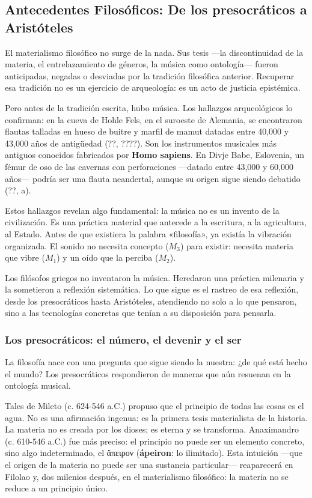 \documentclass[14pt, a4paper]{article}
\begin{document}
\subsection{Antecedentes Filosóficos: De los presocráticos a Aristóteles}
\label{antecedentes-filosoficos}
El materialismo filosófico no surge de la nada. Sus tesis —la
discontinuidad de la materia, el entrelazamiento de géneros, la música
como ontología— fueron anticipadas, negadas o desviadas por la
tradición filosófica anterior. Recuperar esa tradición no es un
ejercicio de arqueología: es un acto de justicia epistémica.

Pero antes de la tradición escrita, hubo música. Los hallazgos
arqueológicos lo confirman: en la cueva de Hohle Fels, en el suroeste
de Alemania, se encontraron flautas talladas en hueso de buitre y
marfil de mamut datadas entre 40,000 y 43,000 años de antigüedad
(??, ????). Son los instrumentos musicales más antiguos
conocidos fabricados por \textbf{Homo sapiens}. En Divje Babe, Eslovenia, un
fémur de oso de las cavernas con perforaciones —datado entre 43,000 y
60,000 años— podría ser una flauta neandertal, aunque su origen sigue
siendo debatido (??, a).

Estos hallazgos revelan algo fundamental: la música no es un invento
de la civilización. Es una práctica material que antecede a la
escritura, a la agricultura, al Estado. Antes de que existiera la
palabra «filosofía», ya existía la vibración organizada. El sonido no
necesita concepto (\(M_3\)) para existir: necesita materia que vibre
(\(M_1\)) y un oído que la perciba (\(M_2\)).

Los filósofos griegos no inventaron la música. Heredaron una práctica
milenaria y la sometieron a reflexión sistemática. Lo que sigue es el
rastreo de esa reflexión, desde los presocráticos hasta Aristóteles,
atendiendo no solo a lo que pensaron, sino a las tecnologías concretas
que tenían a su disposición para pensarla.
\subsubsection{Los presocráticos: el número, el devenir y el ser}
\label{presocraticos}
La filosofía nace con una pregunta que sigue siendo la nuestra: ¿de
qué está hecho el mundo? Los presocráticos respondieron de maneras que
aún resuenan en la ontología musical.

Tales de Mileto (c. 624-546 a.C.) propuso que el principio de todas
las cosas es el agua. No es una afirmación ingenua: es la primera tesis
materialista de la historia. La materia no es creada por los dioses;
es eterna y se transforma. Anaximandro (c. 610-546 a.C.) fue más
preciso: el principio no puede ser un elemento concreto, sino algo
indeterminado, el ἄπειρον (\textbf{ápeiron}: lo ilimitado). Esta intuición
—que el origen de la materia no puede ser una sustancia particular—
reaparecerá en Filolao y, dos milenios después, en el materialismo
filosófico: la materia no se reduce a un principio único.
\end{document}
